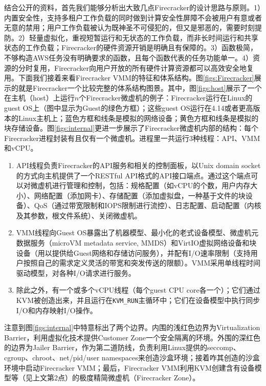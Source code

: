\documentclass[11pt]{article}
\begin{document}
结合公开的资料，首先我们能够分析出大致几点Firecracker的设计思路与原则。1）内置安全性，支持多租户工作负载的同时做到计算安全性屏障不会被用户有意或者无意的禁用；用户工作负载被认为既神圣不可侵犯的，但又是邪恶的，需要时刻提防。2）轻量虚拟化，重视短暂运行和无状态的工作负载，而非长时间运行和共享状态的工作负载；Firecracker的硬件资源开销是明确且有保障的。3）函数极简，不够构造AWS任务没有明确要求的函数，且每个函数代表的任务功能单一。4）资源的分时复用，Firecracker向用户开放的所有硬件计算资源都可以高效安全地复用。下面我们接着来看Firecracker VMM的特征和体系结构。图\ref{figs:Firecracker}展示的就是Firecracker一个比较完整的体系结构图景。其中，图\ref{figs:host}展示了一个在主机（host）上运行$ n $个Firecracker微虚机的例子：Firecracker运行在Linux的guest OS上（图中显示为Guest的绿色方框）；这些guest OS运行在4.14或者更高版本的Linux主机上；蓝色方框和线条是模拟的网络设备；黄色方框和线条是模拟的块存储设备。图\ref{figs:internal}更进一步展示了Firecracker微虚机内部的结构：每个Firecracker进程封装有且仅有一个微虚机。进程里一共运行3种线程：API、VMM和vCPU。
\begin{enumerate}
	\item API线程负责Firecracker的API服务和相关的控制面板，以Unix domain socket的方式向主机提供了一个RESTful API格式的API接口端点。通过这个端点可以对微虚机进行管理和控制，包括：规格配置（如vCPU的个数，用户内存大小）、网络配置（添加网卡）、存储配置（添加虚拟盘，一种基于文件的块设备）、QoS（通过带宽限制和IOPS限制进行流控）、日志配置、启动配置（内核及其参数，根文件系统）、关闭微虚机。
	\item VMM线程向Guest OS暴露出了机器模型、最小化的老式设备模型、微虚机元数据服务（microVM metadata service, MMDS）和VirtIO虚拟网络设备和块设备（用以提供给Guest网络和存储访问服务），并配有I/O速率限制（支持用户按照自己的需求定义灵活的带宽和突发传送的限额）。VMM采用单线程时间驱动模型，对各种I/O请求进行服务。
	\item 除此之外，有一个或多个vCPU线程（每个guest CPU core各一个）；它们通过KVM被创造出来，并且运行在\texttt{KVM\_RUN}主循环中；它们在设备模型中执行同步I/O和内存映射I/O操作。
\end{enumerate}
注意到图\ref{figs:internal}中特意标出了两个边界。内围的浅红色边界为Virtualization Barrier，利用虚拟化技术提供Customer Zone一个安全隔离的环境。外围的深红色的边界为Jailer Barrier，作为第二道防线，负责利用Linux提供的seccomp、cgroup、chroot、net/pid/user namespaces来创造沙盒环境；接着咋其创造的沙盒环境中启动Firecracker VMM；最后，Firecracker VMM利用KVM创建含有设备模型等（见上文第2点）的极度精简微虚机（Firecracker Zone）。
\end{document}
